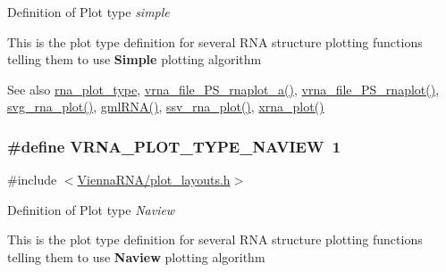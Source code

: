 Definition of Plot type {\itshape simple} 

This is the plot type definition for several R\+NA structure plotting functions telling them to use {\bfseries Simple} plotting algorithm

\begin{DoxySeeAlso}{See also}
\hyperlink{group__plotting__utils_ga5964c4581431b098b80027d6e14dcdd4}{rna\+\_\+plot\+\_\+type}, \hyperlink{group__plotting__utils_ga139a31dd0ba9fc6612431f67de901c31}{vrna\+\_\+file\+\_\+\+P\+S\+\_\+rnaplot\+\_\+a()}, \hyperlink{group__plotting__utils_gabdc8f6548ba4a3bc3cd868ccbcfdb86a}{vrna\+\_\+file\+\_\+\+P\+S\+\_\+rnaplot()}, \hyperlink{group__plotting__utils_gae7853539b5df98f294b4af434e979304}{svg\+\_\+rna\+\_\+plot()}, \hyperlink{group__plotting__utils_ga70834bc8c0aad4fe6824ff76ccb8f329}{gml\+R\+N\+A()}, \hyperlink{group__plotting__utils_gadd368528755f9a830727b680243541df}{ssv\+\_\+rna\+\_\+plot()}, \hyperlink{group__plotting__utils_ga2f6d5953e6a323df898896b8d6614483}{xrna\+\_\+plot()} 
\end{DoxySeeAlso}
\subsubsection[{\texorpdfstring{V\+R\+N\+A\+\_\+\+P\+L\+O\+T\+\_\+\+T\+Y\+P\+E\+\_\+\+N\+A\+V\+I\+EW}{VRNA_PLOT_TYPE_NAVIEW}}]{\setlength{\rightskip}{0pt plus 5cm}\#define V\+R\+N\+A\+\_\+\+P\+L\+O\+T\+\_\+\+T\+Y\+P\+E\+\_\+\+N\+A\+V\+I\+EW~1}\hypertarget{group__plotting__utils_ga94d4c863ecac2f220f76658afb92f964}{}\label{group__plotting__utils_ga94d4c863ecac2f220f76658afb92f964}


{\ttfamily \#include $<$\hyperlink{plot__layouts_8h}{Vienna\+R\+N\+A/plot\+\_\+layouts.\+h}$>$}



Definition of Plot type {\itshape Naview} 

This is the plot type definition for several R\+NA structure plotting functions telling them to use {\bfseries Naview} plotting algorithm

